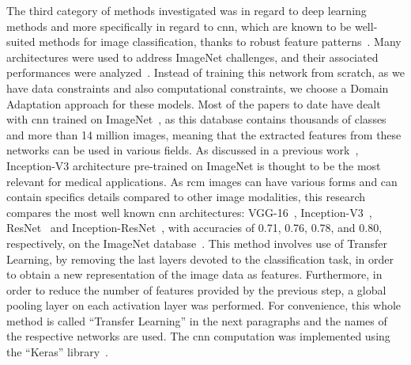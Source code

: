 \documentclass[journal,article,accept,moreauthors,pdftex, applsci]{Definitions/mdpi}
\providecommand{\DIFadd}[1]{{\protect\color{blue}\uwave{#1}}} %
\providecommand{\DIFaddbegin}{} %
\providecommand{\DIFaddend}{} %
\providecommand{\DIFdelend}{} %
\begin{document}
\DIFdelend The third category of methods investigated was in regard to deep learning methods and more specifically in regard to \ac{cnn}, which are known to be well-suited methods for image classification, thanks to robust feature patterns~\cite{Pathan2018}. Many architectures were used to address ImageNet challenges, and their associated performances were analyzed~\cite{Canziani2016}. Instead of training this network from scratch, as we have data constraints and also computational constraints, we choose a Domain Adaptation approach for these models. Most of the papers to date have dealt with \ac{cnn} trained on ImageNet~\cite{Deng2008}, as this database contains thousands of classes and more than 14 million images, meaning that the extracted features from these networks can be used in various fields. As discussed in a previous work~\cite{Litjens2017}, Inception-V3 architecture pre-trained on ImageNet is thought to be the most relevant for medical applications. As \ac{rcm} images can have various forms and can contain specifics details compared to other image modalities, this research compares the most well known \ac{cnn} architectures: VGG-16~\cite{Simonyan2014}, Inception-V3~\cite{Szegedy2015}, ResNet~\cite{He2016} and Inception-ResNet~\cite{Szegedy2017}, with accuracies of 0.71, 0.76, 0.78, and 0.80, respectively, on the ImageNet database~\cite{Canziani2016}. This method involves \DIFaddbegin \DIFadd{the }\DIFaddend use of Transfer Learning, by removing the last layers devoted to the classification task, in order to obtain a new representation of the image data as features. Furthermore, in order to reduce the number of features provided by the previous step, a global pooling layer on each activation layer was performed. For convenience, this whole method is called “Transfer Learning” in the next paragraphs and the names of the respective networks are used. The \ac{cnn} computation was implemented using the “Keras” library~\cite{chollet2015keras}.\par

\end{document}
